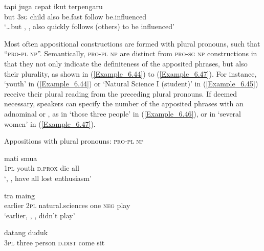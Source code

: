 \ea
\label{Example_6.43}
\gll {\ldots} {tapi} {} {} {juga} {cepat} {ikut} {terpengaru}\\ %
 { }  but  \textsc{3sg}  child  also  be.fast  follow  be.influenced\\
\glt
‘\ldots but , , also quickly follows (others) to be influenced’ \textstyleExampleSource{[080917-010-CvEx.0001]}
\z


Most often appositional constructions are formed with plural pronouns, such that ``\textsc{pro-pl} \textsc{np}''. Semantically, \textsc{pro-pl} \textsc{np} are distinct from \textsc{pro-sg} \textsc{np} constructions in that they not only indicate the definiteness of the apposited  phrases, but also their plurality, as shown in (\ref{Example_6.44}) to (\ref{Example_6.47}). For instance,  ‘youth’ in (\ref{Example_6.44}) or  ‘Natural Science I (student)’ in (\ref{Example_6.45}) receive their plural reading from the preceding plural pronouns. If deemed necessary, speakers can specify the number of the apposited  phrases with an adnominal  or , as in  ‘those three people’ in (\ref{Example_6.46}), or in  ‘several women’ in (\ref{Example_6.47}).



\begin{styleExampleTitle}
Appositions with plural pronouns: \textsc{pro-pl} \textsc{np}
\end{styleExampleTitle}

\ea
\label{Example_6.44}
 {} {} {mati} {smua}\\ %
 \textsc{1pl}  youth  \textsc{d.prox}  die  all\\

\glt
‘, , have all lost enthusiasm’ \textstyleExampleSource{[081006-017-Cv.0014]}
\z

\ea
\label{Example_6.45}
 {} {} {} {tra} {maing}\\ %
 earlier  \textsc{2pl}  natural.sciences  one  \textsc{neg}  play\\

\glt
‘earlier, , , didn’t play’ \textstyleExampleSource{[081109-001-Cv.0162]}
\z

\ea
\label{Example_6.46}
 {} {} {} {datang} {duduk}\\ %
 \textsc{3pl}  three  person  \textsc{d.dist}  come  sit\\

